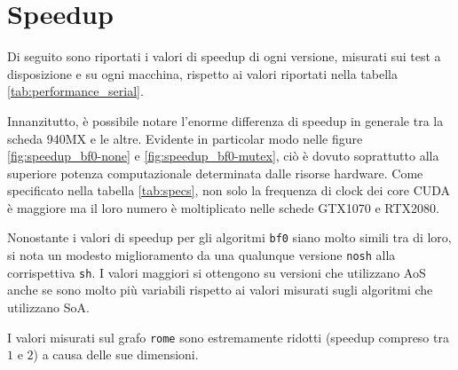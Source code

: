 \documentclass[12pt,a4paper,oneside]{book}
\begin{document}
	\section{Speedup}
	Di seguito sono riportati i valori di speedup di ogni versione, misurati sui test a disposizione e su ogni macchina, rispetto ai valori riportati nella tabella \ref{tab:performance_serial}.
	
	Innanzitutto, è possibile notare l'enorme differenza di speedup in generale tra la scheda 940MX e le altre. Evidente in particolar modo nelle figure \ref{fig:speedup_bf0-none} e \ref{fig:speedup_bf0-mutex}, ciò è dovuto soprattutto alla superiore potenza computazionale determinata dalle risorse hardware. Come specificato nella tabella \ref{tab:specs}, non solo la frequenza di clock dei core CUDA è maggiore ma il loro numero è moltiplicato nelle schede GTX1070 e RTX2080.
	
	Nonostante i valori di speedup per gli algoritmi \texttt{bf0} siano molto simili tra di loro, si nota un modesto miglioramento da una qualunque versione \texttt{nosh} alla corrispettiva \texttt{sh}. I valori maggiori si ottengono su versioni che utilizzano AoS anche se sono molto più variabili rispetto ai valori misurati sugli algoritmi che utilizzano SoA.
	
	I valori misurati sul grafo \texttt{rome} sono estremamente ridotti (speedup compreso tra $1$ e $2$) a causa delle sue dimensioni.
	
\end{document}
